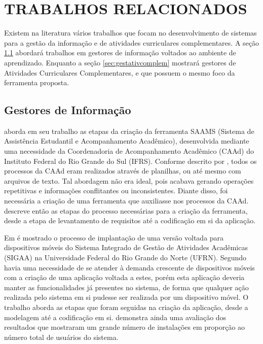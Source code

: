\chapter{TRABALHOS RELACIONADOS}
\label{chap:trabalhosrelacionados}

Existem na literatura vários trabalhos que focam no desenvolvimento de sistemas para a gestão da informação e de atividades curriculares complementares.
A seção \ref{sec:gestacademic} abordará trabalhos em gestores de informação voltados ao ambiente de aprendizado. Enquanto a seção \ref{sec:gestativcomplem} mostrará gestores de Atividades Curriculares Complementares, e que possuem o mesmo foco da ferramenta proposta.

\section{Gestores de Informação}
\label{sec:gestacademic}

\cite{cardoso2018desenvolvimento} aborda em seu trabalho as etapas da criação da ferramenta SAAMS (Sistema de Assistência Estudantil e Acompanhamento Acadêmico), desenvolvida mediante uma necessidade da Coordenadoria de Acompanhamento Acadêmico (CAAd) do Instituto
Federal do Rio Grande do Sul (IFRS). Conforme descrito por \cite{cardoso2018desenvolvimento}, todos os processos da CAAd eram realizados através de planilhas, ou até mesmo com arquivos de texto. Tal abordagem não era ideal, pois acabava gerando operações repetitivas e informações conflitantes ou inconsistentes. Diante disso, foi necessária a criação de uma ferramenta que auxiliasse nos processos da CAAd. \cite{cardoso2018desenvolvimento} descreve então as etapas do processo necessárias para a criação da ferramenta, desde a etapa de levantamento de requisitos até a codificação em si da aplicação.

Em \cite{barroca2013sigaa} é mostrado o processo de implantação de uma versão voltada para dispositivos móveis do Sistema Integrado
de Gestão de Atividades Acadêmicas (SIGAA) na Universidade Federal do Rio Grande do Norte (UFRN). Segundo \cite{barroca2013sigaa} havia uma necessidade de se atender à demanda crescente de dispositivos móveis com a criação de uma aplicação voltada a estes, porém esta aplicação deveria manter as funcionalidades já presentes no sistema, de forma que qualquer ação realizada pelo sistema em si pudesse ser realizada por um dispositivo móvel. O trabalho aborda as etapas que foram seguidas na criação da aplicação, desde a modelagem até a codificação em si. \cite{barroca2013sigaa} demonstra ainda uma avaliação dos resultados que mostraram um grande número de instalações em proporção ao número total de usuários do sistema.

